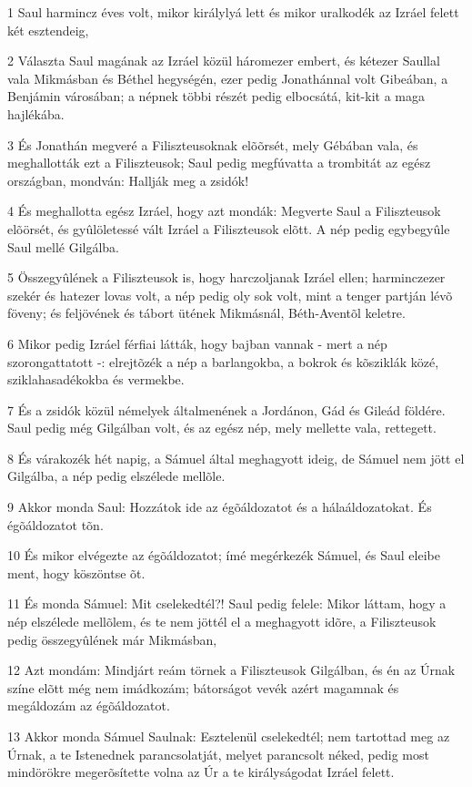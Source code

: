 \par 1 Saul harmincz éves volt, mikor királylyá lett és mikor uralkodék az Izráel felett két esztendeig,
\par 2 Választa Saul magának az Izráel közül háromezer embert, és kétezer Saullal vala Mikmásban és Béthel hegységén, ezer pedig Jonathánnal volt Gibeában, a Benjámin városában; a népnek többi részét pedig elbocsátá, kit-kit a maga hajlékába.
\par 3 És Jonathán megveré a Filiszteusoknak elõõrsét, mely Gébában vala, és meghallották ezt a Filiszteusok; Saul pedig megfúvatta a trombitát az egész országban, mondván: Hallják meg a zsidók!
\par 4 És meghallotta egész Izráel, hogy azt mondák: Megverte Saul a Filiszteusok elõörsét, és gyûlöletessé vált Izráel a Filiszteusok elõtt. A nép pedig egybegyûle Saul mellé Gilgálba.
\par 5 Összegyûlének a Filiszteusok is, hogy harczoljanak Izráel ellen; harminczezer szekér és hatezer lovas volt, a nép pedig oly sok volt, mint a tenger partján lévõ föveny; és feljövének és tábort ütének Mikmásnál, Béth-Aventõl keletre.
\par 6 Mikor pedig Izráel férfiai látták, hogy bajban vannak - mert a nép szorongattatott -: elrejtõzék a nép a barlangokba, a bokrok és kõsziklák közé, sziklahasadékokba és vermekbe.
\par 7 És a zsidók közül némelyek általmenének a Jordánon, Gád és Gileád földére. Saul pedig még Gilgálban volt, és az egész nép, mely mellette vala, rettegett.
\par 8 És várakozék hét napig, a Sámuel által meghagyott ideig, de Sámuel nem jött el Gilgálba, a nép pedig elszélede mellõle.
\par 9 Akkor monda Saul: Hozzátok ide az égõáldozatot és a hálaáldozatokat. És égõáldozatot tõn.
\par 10 És mikor elvégezte az égõáldozatot; ímé megérkezék Sámuel, és Saul eleibe ment, hogy köszöntse õt.
\par 11 És monda Sámuel: Mit cselekedtél?! Saul pedig felele: Mikor láttam, hogy a nép elszélede mellõlem, és te nem jöttél el a meghagyott idõre, a Filiszteusok pedig összegyûlének már Mikmásban,
\par 12 Azt mondám: Mindjárt reám törnek a Filiszteusok Gilgálban, és én az Úrnak színe elõtt még nem imádkozám; bátorságot vevék azért magamnak és megáldozám az égõáldozatot.
\par 13 Akkor monda Sámuel Saulnak: Esztelenül cselekedtél; nem tartottad meg az Úrnak, a te Istenednek parancsolatját, melyet parancsolt néked, pedig most mindörökre megerõsítette volna az Úr a te királyságodat Izráel felett.
